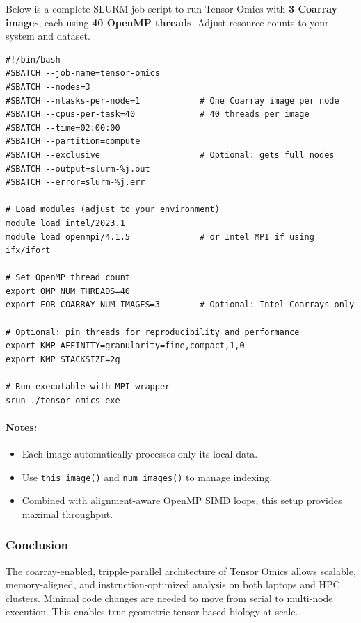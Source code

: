 \documentclass{article}
\begin{document}
Below is a complete SLURM job script to run Tensor Omics with \textbf{3 Coarray images}, each using \textbf{40 OpenMP threads}. Adjust resource counts to your system and dataset.

\begin{verbatim}
#!/bin/bash
#SBATCH --job-name=tensor-omics
#SBATCH --nodes=3
#SBATCH --ntasks-per-node=1            # One Coarray image per node
#SBATCH --cpus-per-task=40             # 40 threads per image
#SBATCH --time=02:00:00
#SBATCH --partition=compute
#SBATCH --exclusive                    # Optional: gets full nodes
#SBATCH --output=slurm-%j.out
#SBATCH --error=slurm-%j.err

# Load modules (adjust to your environment)
module load intel/2023.1
module load openmpi/4.1.5              # or Intel MPI if using ifx/ifort

# Set OpenMP thread count
export OMP_NUM_THREADS=40
export FOR_COARRAY_NUM_IMAGES=3        # Optional: Intel Coarrays only

# Optional: pin threads for reproducibility and performance
export KMP_AFFINITY=granularity=fine,compact,1,0
export KMP_STACKSIZE=2g

# Run executable with MPI wrapper
srun ./tensor_omics_exe
\end{verbatim}

\paragraph{Notes:}
\begin{itemize}
\item Each image automatically processes only its local data.
\item Use \texttt{this\_image()} and \texttt{num\_images()} to manage indexing.
\item Combined with alignment-aware OpenMP SIMD loops, this setup provides maximal throughput.
\end{itemize}

\subsubsection{Conclusion}
The coarray-enabled, tripple-parallel architecture of Tensor Omics allows scalable, memory-aligned, and instruction-optimized analysis on both laptops and HPC clusters. Minimal code changes are needed to move from serial to multi-node execution. This enables true geometric tensor-based biology at scale.
\end{document}

